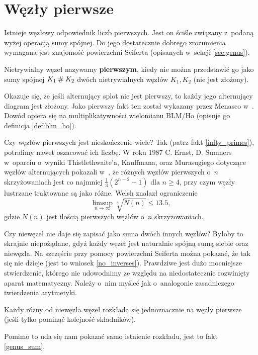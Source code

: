 \section{Węzły pierwsze}
\label{sec:prime_knots}
Istnieje węzłowy odpowiednik liczb pierwszych.
Jest on ściśle związany z~podaną wyżej operacją sumy spójnej.
Do jego dostatecznie dobrego zrozumienia wymagana jest znajomość powierzchni Seiferta (opisanych w~sekcji \ref{sec:genus}).

\begin{definition}
	\label{primeknot}
    Nietrywialny węzeł nazywamy \textbf{pierwszym},
    kiedy nie można przedstawić go jako sumy spójnej $K_1 \mathbin{\#} K_2$
    dwóch nietrywialnych węzłów $K_1, K_2$ (nie jest złożony).
\end{definition}

Okazuje się, że jeśli alternujący splot nie jest pierwszy,
to każdy jego alternujący diagram jest złożony.
Jako pierwszy fakt ten został wykazany przez Menasco w~\cite{menasco84}.
Dowód opiera się na multiplikatywności wielomianu BLM/Ho (opisuje go definicja \ref{def:blm_ho}).

Czy węzłów pierwszych jest nieskończenie wiele?
Tak (patrz fakt \ref{infty_primes}), potrafimy nawet oszacować ich liczbę.
W roku 1987 C. Ernst, D. Sumners w~oparciu o~wyniki Thistlethwaite'a, Kauffmana, oraz Murasugiego dotyczące węzłów alternujących pokazali w~\cite{ernst87},
że różnych węzłów pierwszych o~$n$ skrzyżowaniach jest co najmniej $\frac 1 3 (2^{n- 2} - 1)$ dla $n \ge 4$,
przy czym węzły lustrzane traktowane są jako różne.
Welsh znalazł ograniczenie
\[
    \limsup_{n \to \infty} \sqrt[n]{N(n)} \le 13.5,
\]
gdzie $N(n)$ jest ilością pierwszych węzłów o~$n$ skrzyżowaniach.

Czy niewęzeł nie daje się zapisać jako suma dwóch innych węzłów?
Byłoby to skrajnie niepożądane, gdyż każdy węzeł jest naturalnie spójną sumą siebie oraz niewęzła.
Na szczęście przy pomocy powierzchni Seiferta można pokazać, że tak się nie dzieje (jest to wniosek \ref{no_inverses}).
Prawdziwe jest dużo mocniejsze stwierdzenie,
którego nie udowodnimy ze względu na niedostatecznie rozwinięty aparat matematyczny.
Należy o~nim myśleć jak o~analogonie zasadniczego twierdzenia arytmetyki.

\begin{theorem}[Schubert, 1949]
    Każdy różny od niewęzła węzeł rozkłada się jednoznacznie na węzły pierwsze
    (jeśli tylko pominąć kolejność składników).
\end{theorem}

Pomimo to uda się nam pokazać samo istnienie rozkładu, jest to fakt \ref{genus_sum}.
